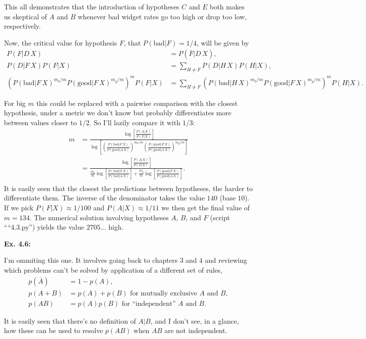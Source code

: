\documentclass{article}
\begin{document}
This all demonstrates that the introduction of hypotheses $C$ and $E$ both makes us skeptical of $A$ and $B$ whenever bad widget rates go too high or drop too low, respectively.

Now, the critical value for hypothesis $F$, that $P(\text{bad}|F)=1/4$, will be given by
\begin{align*}
	P(F|D\,X)&=P(\overline F|D\,X),\\
	P(D|F\,X)P(F|X)&=\sum_{H\neq F}P(D|H\,X)P(H|X),\\
	\left(P(\text{bad}|F\,X)^{m_b/m}P(\text{good}|F\,X)^{m_g/m}\right)^mP(F|X)&=\sum_{H\neq F}\left(P(\text{bad}|H\,X)^{m_b/m}P(\text{good}|F\,X)^{m_g/m}\right)^mP(H|X).
\end{align*}

For big $m$ this could be replaced with a pairwise comparison with the closest hypothesis, under a metric we don't know but probably differentiates more between values closer to $1/2$. So I'll lazily compare it with $1/3$:
\begin{align*}
	m&=\frac{\log\left[\frac{P(A|X)}{P(F|X)}\right]}{\log\left[\left(\frac{P(\text{bad}|F\,X)}{P(\text{good}|A\,X)}\right)^{m_b/m}\left(\frac{P(\text{good}|F\,X)}{P(\text{good}|A\,X)}\right)^{m_g/m}\right]}\\
	&=\frac{\log\left[\frac{P(A|X)}{P(F|X)}\right]}{\frac{m_b}m\log\left[\frac{P(\text{bad}|F\,X)}{P(\text{bad}|A\,X)}\right]+\frac{m_g}m\log\left[\frac{P(\text{good}|F\,X)}{P(\text{good}|A\,X)}\right]}.\\
\end{align*}
It is easily seen that the closest the predictions between hypotheses, the harder to differentiate them. The inverse of the denominator takes the value $140$ (base $10$). If we pick $P(F|X)\approx1/100$ and $P(A|X)\approx1/11$ we then get the final value of $m=134$. The numerical solution involving hypotheses $A$, $B$, and $F$ (script ````4.3.py'') yields the value $2705$... high.

\textbf{Ex. 4.6: }

I'm ommiting this one. It involves going back to chapters $3$ and $4$ and reviewing which problems can't be solved by application of a different set of rules,
\begin{align*}
	p(\overline{A})&=1-p(A),\\
	p(A+B)&=p(A)+p(B)\text{ for mutually exclusive $A$ and $B$},\\
	p(AB)&=p(A)p(B)\text{ for ``independent'' $A$ and $B$}.
\end{align*}

It is easily seen that there's no definition of $A|B$, and I don't see, in a glance, how these can be used to resolve $p(AB)$ when $AB$ are not independent.
\end{document}
